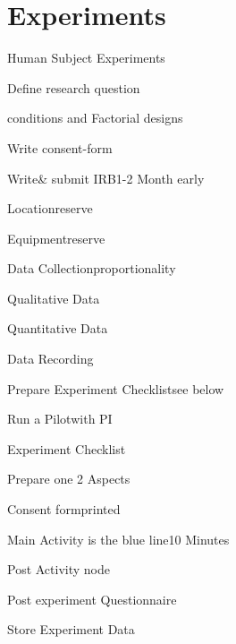 
\section{Experiments}
\begin{checklist}{Human Subject Experiments}
    \item{Define research question}{}
    \item{conditions and Factorial designs }{\cite{FactorialTB,FactorialWiki}}
        \item{Write consent-form}{}
    \item{Write\& submit IRB}{1-2 Month early}
    \item{Location}{reserve}
    \item{Equipment}{reserve}
    \item{Data Collection}{proportionality}
    \item{Qualitative Data}{}
    \item{Quantitative Data}{}
    \item{Data Recording}{}
    \item{Prepare Experiment Checklist}{see below}
    \item{Run a Pilot}{with PI}
\end{checklist}


\begin{checklist}{Experiment Checklist}
  \item{Prepare one }{2 Aspects} 
  \item{Consent form}{printed}
  \item{Main Activity is the blue line}{10 Minutes}
  \item{Post Activity node}{}
  \item{Post experiment Questionnaire}{}
  \item{Store Experiment Data}{}
\end{checklist}